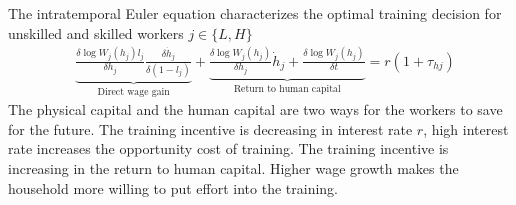 \documentclass[12pt]{article}
\begin{document}
The intratemporal Euler equation characterizes the optimal training decision for unskilled and skilled workers $j\in\{L,H\}$
\begin{align*}
&\underbrace{\frac{\delta \log W_j(h_j)l_j}{\delta h_j}\frac{\delta \dot{h}_j}{\delta (1-l_j)}}_{\text{Direct wage gain}}+\underbrace{\frac{\delta \log W_j(h_j)}{\delta h_j}\dot{h}_j+\frac{\delta \log W_j(h_j)}{\delta t}}_{\text{Return to human capital}}= r(1+\tau_{hj})
\end{align*}
The physical capital and the human capital are two ways for the workers to save for the future. The training incentive is decreasing in interest rate $r$, high interest rate increases the opportunity cost of training. The training incentive is increasing in the return to human capital. Higher wage growth makes the household more willing to put effort into the training.
\end{document}
